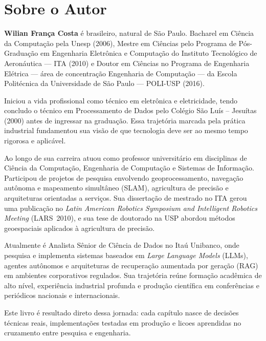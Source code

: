 \chapter*{Sobre o Autor}
\thispagestyle{plain}

\noindent
\textbf{Wilian Fran\c{c}a Costa} \'e brasileiro, natural de S\~ao Paulo.
Bacharel em Ci\^encia da Computa\c{c}\~ao pela Unesp (2006), Mestre em
Ci\^encias pelo Programa de P\'os-Gradua\c{c}\~ao em Engenharia Eletr\^onica
e Computa\c{c}\~ao do Instituto Tecnol\'ogico de Aeron\'autica --- ITA (2010)
e Doutor em Ci\^encias no Programa de Engenharia El\'etrica ---
\'area de concentra\c{c}\~ao Engenharia de Computa\c{c}\~ao --- da Escola
Polit\'ecnica da Universidade de S\~ao Paulo --- POLI-USP (2016).

Iniciou a vida profissional como t\'ecnico em eletr\^onica e eletricidade,
tendo concludo o t\'ecnico em Processamento de Dados pelo Col\'egio
S\~ao Lu\'is -- Jesu\'itas (2000) antes de ingressar na gradua\c{c}\~ao.
Essa trajet\'oria marcada pela pr\'atica industrial fundamentou sua
vis\~ao de que tecnologia deve ser ao mesmo tempo rigorosa e aplic\'avel.

Ao longo de sua carreira atuou como professor universit\'ario em
disciplinas de Ci\^encia da Computa\c{c}\~ao, Engenharia de
Computa\c{c}\~ao e Sistemas de Informa\c{c}\~ao. Participou de projetos
de pesquisa envolvendo geoprocessamento, navega\c{c}\~ao aut\^onoma e
mapeamento simult\^aneo (SLAM), agricultura de precis\~ao e
arquiteturas orientadas a servi\c{c}os. Sua disserta\c{c}\~ao de
mestrado no ITA gerou uma publica\c{c}\~ao no \emph{Latin American
Robotics Symposium and Intelligent Robotics Meeting} (LARS~2010), e sua
tese de doutorado na USP abordou m\'etodos geoespaciais aplicados \`a
agricultura de precis\~ao.

Atualmente \'e Analista S\^enior de Ci\^encia de Dados no Ita\'u
Unibanco, onde pesquisa e implementa sistemas baseados em \emph{Large
Language Models} (LLMs), agentes aut\^onomos e arquiteturas de
recupera\c{c}\~ao aumentada por gera\c{c}\~ao (RAG) em ambientes
corporativos regulados.  Sua trajet\'oria re\'une forma\c{c}\~ao
acad\^emica de alto n\'ivel, experi\^encia industrial profunda e
produ\c{c}\~ao cient\'ifica em confer\^encias e peri\'odicos nacionais
e internacionais.

Este livro \'e resultado direto dessa jornada: cada cap\'itulo nasce
de decis\~oes t\'ecnicas reais, implementa\c{c}\~oes testadas em
produ\c{c}\~ao e licoes aprendidas no cruzamento entre pesquisa e
engenharia.

